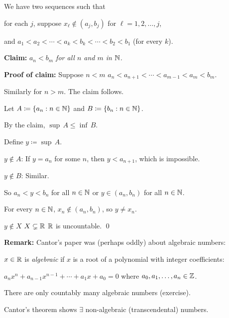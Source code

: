 \documentclass[10pt,aspectratio=169]{beamer}
\begin{document}
\begin{frame}
We have two sequences such that

for each $j$, suppose $x_\ell \notin (a_{j},b_{j})$ for $\ell=1,2,\ldots,j$,

and 
$a_1 < a_2 < \cdots < a_{k} < b_{k} < \cdots < b_2 < b_1$ (for every $k$).

\medskip
\pause

\textbf{Claim:} \emph{$a_n < b_m$ for all $n$ and $m$ in ${\mathbb{N}}$.}

\pause
\textbf{Proof of claim:}
Suppose $n < m$ \pause \wthus
$a_n < a_{n+1} < \cdots < a_{m-1} < a_m < b_m$.

\pause
Similarly for $n > m$.  The claim follows.

\medskip
\pause

Let $A \coloneqq \{ a_n : n \in {\mathbb{N}} \}$ and $B \coloneqq \{ b_n : n \in {\mathbb{N}} \}$.

\pause
By the claim, \quad $\sup\, A \leq \inf\, B$.

\pause
Define $y \coloneqq \sup\, A$.

\pause
$y \notin A$: If $y=a_n$ for some $n$, then $y < a_{n+1}$, which is impossible.

\pause
$y \notin B$: Similar.

\pause
So $a_n < y < b_n$ for all $n \in {\mathbb{N}}$ \quad or \quad $y \in (a_n,b_n)$ for
all $n \in {\mathbb{N}}$.

\pause
For every $n \in {\mathbb{N}}$, $x_n \not\in (a_n,b_n)$, so $y \not= x_n$.

\pause
\thus \quad $y \notin X$ \pause \wthus $X \subsetneq {\mathbb{R}}$ \pause \wthus ${\mathbb{R}}$
is uncountable.
\qed
\end{frame}

\begin{frame}
\textbf{Remark:}
Cantor's paper was (perhaps oddly) about algebraic numbers:

\medskip
\pause

$x \in {\mathbb{R}}$ is \emph{algebraic} if $x$ is a root of a polynomial with
integer coefficients:

$a_n x^n + a_{n-1} x^{n-1}  + \cdots
+ a_1 x + a_0 = 0$ \quad where $a_0,a_1,\ldots,a_n \in {\mathbb{Z}}$.

\medskip
\pause

There are only countably many algebraic numbers (exercise).

\medskip
\pause

Cantor's theorem shows $\exists$ non-algebraic (transcendental)
numbers.

\end{frame}
\end{document}
